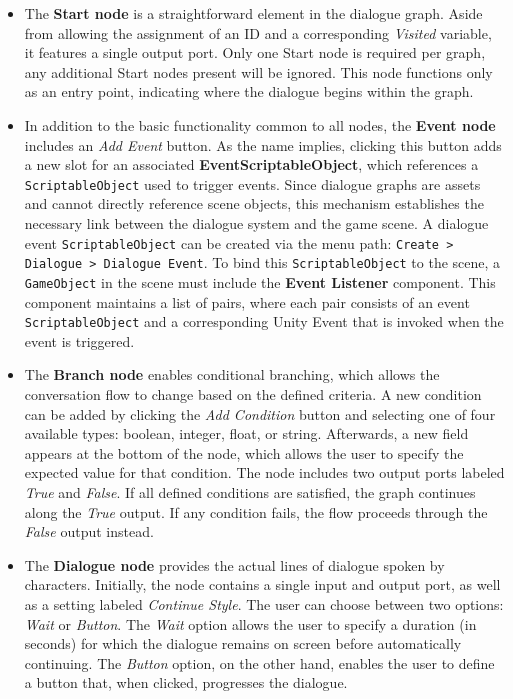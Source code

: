 \begin{itemize}
    \item The \textbf{Start node }is a straightforward element in the dialogue graph. Aside from allowing the assignment of an ID and a corresponding \textit{Visited} variable, it features a single output port. Only one Start node is required per graph, any additional Start nodes present will be ignored. This node functions only as an entry point, indicating where the dialogue begins within the graph.
    \item In addition to the basic functionality common to all nodes, the \textbf{Event node} includes an \textit{Add Event} button. As the name implies, clicking this button adds a new slot for an associated \textbf{EventScriptableObject}, which references a \verb|ScriptableObject| used to trigger events. Since dialogue graphs are assets and cannot directly reference scene objects, this mechanism establishes the necessary link between the dialogue system and the game scene. A dialogue event \verb|ScriptableObject| can be created via the menu path: \verb|Create > Dialogue > Dialogue Event|. To bind this \verb|ScriptableObject| to the scene, a \verb|GameObject| in the scene must include the \textbf{Event Listener} component. This component maintains a list of pairs, where each pair consists of an event \verb|ScriptableObject| and a corresponding Unity Event that is invoked when the event is triggered. 
    \item The \textbf{Branch node} enables conditional branching, which allows the conversation flow to change based on the defined criteria. A new condition can be added by clicking the \textit{Add Condition} button and selecting one of four available types: boolean, integer, float, or string. Afterwards, a new field appears at the bottom of the node, which allows the user to specify the expected value for that condition. The node includes two output ports labeled \textit{True} and \textit{False}. If all defined conditions are satisfied, the graph continues along the \textit{True} output. If any condition fails, the flow proceeds through the \textit{False} output instead. 
    \item The \textbf{Dialogue node} provides the actual lines of dialogue spoken by characters. Initially, the node contains a single input and output port, as well as a setting labeled \textit{Continue Style}. The user can choose between two options: \textit{Wait} or \textit{Button}. The \textit{Wait} option allows the user to specify a duration (in seconds) for which the dialogue remains on screen before automatically continuing. The \textit{Button} option, on the other hand, enables the user to define a button that, when clicked, progresses the dialogue.


\end{itemize}
